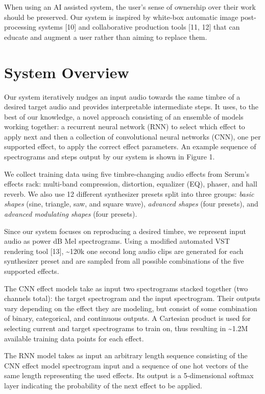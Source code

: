 \documentclass{article}
\begin{document}
When using an AI assisted system, the user's sense of ownership over their work should be preserved. Our system is inspired by white-box automatic image post-processing systems [10] and collaborative production tools [11, 12] that can educate and augment a user rather than aiming to replace them. 

\section{System Overview}

Our system iteratively nudges an input audio towards the same timbre of a desired target audio and provides interpretable intermediate steps. It uses, to the best of our knowledge, a novel approach consisting of an ensemble of models working together: a recurrent neural network (RNN) to select which effect to apply next and then a collection of convolutional neural networks (CNN), one per supported effect, to apply the correct effect parameters. An example sequence of spectrograms and steps output by our system is shown in Figure 1.

We collect training data using five timbre-changing audio effects from Serum's effects rack: multi-band compression, distortion, equalizer (EQ), phaser, and hall reverb. We also use 12 different synthesizer presets split into three groups: \emph{basic shapes} (sine, triangle, saw, and square wave), \emph{advanced shapes} (four presets), and \emph{advanced modulating shapes} (four presets).

Since our system focuses on reproducing a desired timbre, we represent input audio as power dB Mel spectrograms. Using a modified automated VST rendering tool [13], \textasciitilde120k one second long audio clips are generated for each synthesizer preset and are sampled from all possible combinations of the five supported effects.

The CNN effect models take as input two spectrograms stacked together (two channels total): the target spectrogram and the input spectrogram. Their outputs vary depending on the effect they are modeling, but consist of some combination of binary, categorical, and continuous outputs. A Cartesian product is used for selecting current and target spectrograms to train on, thus resulting in \textasciitilde1.2M available training data points for each effect.

The RNN model takes as input an arbitrary length sequence consisting of the CNN effect model spectrogram input and a sequence of one hot vectors of the same length representing the used effects. Its output is a 5-dimensional softmax layer indicating the probability of the next effect to be applied. 
\end{document}
